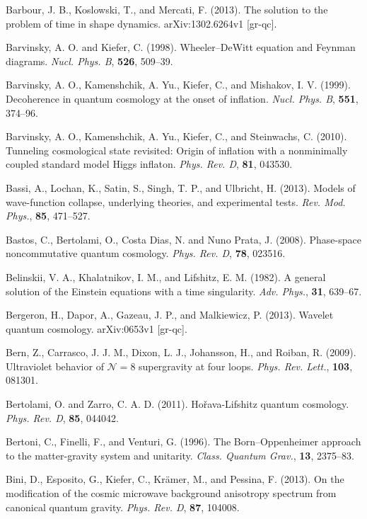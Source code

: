\documentclass[12pt]{article}
\begin{document}
\bibitem{} Barbour, J. B., Koslowski, T., and Mercati, F. (2013).
The solution to the problem of time in shape dynamics.
arXiv:1302.6264v1 [gr-qc].

\bibitem{} Barvinsky, A. O. and Kiefer, C. (1998). Wheeler--DeWitt equation
           and Feynman diagrams. {\em Nucl. Phys. B}, {\bf 526},
           509--39.

\bibitem{} Barvinsky, A. O., Kamenshchik, A. Yu., Kiefer, C., and
           Mishakov, I. V. (1999). Decoherence in quantum cosmology
           at the onset of inflation. {\em Nucl. Phys. B}, {\bf 551},
           374--96.

\bibitem{} Barvinsky, A. O., Kamenshchik, A. Yu., Kiefer, C.,
           and Steinwachs, C. (2010).
           Tunneling cosmological state revisited: Origin of inflation
           with a nonminimally coupled standard model Higgs inflaton. 
           {\em Phys. Rev. D}, {\bf 81}, 043530.

\bibitem{} Bassi, A., Lochan, K., Satin, S., Singh, T. P., and
  Ulbricht, H. (2013). Models of wave-function collapse, underlying
  theories, and experimental tests. {\em Rev. Mod. Phys.}, {\bf 85},
  471--527. 

\bibitem{} Bastos, C., Bertolami, O., Costa Dias, N. and Nuno Prata,
  J. (2008). Phase-space noncommutative quantum cosmology.
{\em Phys. Rev. D}, {\bf 78}, 023516.

\bibitem{} Belinskii, V. A., Khalatnikov, I. M., and Lifshitz, E. M. (1982).
           A general solution of the Einstein equations with a time
           singularity. {\em Adv. Phys.}, {\bf 31}, 639--67.

\bibitem{} Bergeron, H., Dapor, A., Gazeau, J. P., and Malkiewicz, P. (2013).
           Wavelet quantum cosmology. arXiv:0653v1 [gr-qc].

\bibitem{} Bern, Z., Carrasco, J. J. M., Dixon, L. J., Johansson, H.,
           and Roiban, R. (2009). Ultraviolet behavior of ${\mathcal
           N}=8$ supergravity at four loops. {\em Phys. Rev. Lett.},
           {\bf 103}, 081301.

\bibitem{} Bertolami, O. and Zarro, C. A. D. (2011). 
          Ho\v{r}ava-Lifshitz quantum cosmology.
          {\em Phys. Rev. D}, {\bf 85}, 044042.

\bibitem{} Bertoni, C., Finelli, F., and Venturi, G. (1996). The
           Born--Oppenheimer approach to the matter-gravity system and 
           unitarity. {\em Class. Quantum Grav.}, {\bf 13}, 2375--83.

\bibitem{} Bini, D., Esposito, G., Kiefer, C., Kr\"amer, M., and Pessina, F.
  (2013). On the modification of the cosmic microwave background
  anisotropy spectrum from canonical quantum gravity. 
 {\em Phys. Rev. D}, {\bf 87}, 104008.
\end{document}
